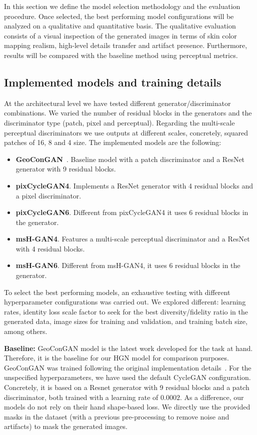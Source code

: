 In this section we define the model selection methodology and the evaluation procedure. Once selected, the best performing model configurations will be analyzed on a qualitative and quantitative basis. The qualitative evaluation consists of a visual inspection of the generated images in terms of skin color mapping realism, high-level details transfer and artifact presence. Furthermore, results will be compared with the baseline method using perceptual metrics.

\subsection{Implemented models and training details}
At the architectural level we have tested different generator/discriminator combinations. We varied the number of residual blocks in the generators and the discriminator type (patch, pixel and perceptual). Regarding the multi-scale perceptual discriminators we use outputs at different scales, concretely, squared patches of 16, 8 and 4 size. The implemented models are the following:
\begin{itemize}
	\item \textbf{\ac{GeoConGAN}}~\cite{Mueller2018}. Baseline model with a patch discriminator and a ResNet generator with 9 residual blocks.
	\item \textbf{pixCycleGAN4}. Implements a ResNet generator with 4 residual blocks and a pixel discriminator.
	\item \textbf{pixCycleGAN6}. Different from pixCycleGAN4 it uses 6 residual blocks in the generator.
	\item \textbf{msH-GAN4}. Features a multi-scale perceptual discriminator and a ResNet with 4 residual blocks.
	\item \textbf{msH-GAN6}. Different from msH-GAN4, it uses 6 residual blocks in the generator.
\end{itemize}

To select the best performing models, an exhaustive testing with different hyperparameter configurations was carried out. We explored different: learning rates, identity loss scale factor to seek for the best diversity/fidelity ratio in the generated data, image sizes for training and validation, and training batch size, among others.

\vspace*{0.1cm}\noindent\textbf{Baseline:} \ac{GeoConGAN} model is the latest work developed for the task at hand. Therefore, it is the baseline for our \ac{HGN} model for comparison purposes. \ac{GeoConGAN} was trained following the original implementation details~\cite{Mueller2018}. For the unspecified hyperparameters, we have used the default \ac{CycleGAN} configuration. Concretely, it is based on a Resnet generator with 9 residual blocks and a patch discriminator, both trained with a learning rate of $0.0002$. As a difference, our models do not rely on their hand shape-based loss. We directly use the provided masks in the dataset (with a previous pre-processing to remove noise and artifacts) to mask the generated images. 

